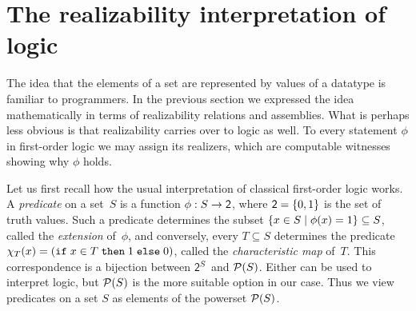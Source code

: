 





\section{The realizability interpretation of logic}
\label{sec:realizability-interpretation}


The idea that the elements of a set are represented by values of a
datatype is familiar to programmers. In the previous section we
expressed the idea mathematically in terms of realizability relations
and assemblies. What is perhaps less obvious is that realizability
carries over to logic as well. To every statement $\phi$ in
first-order logic we may assign its realizers, which are computable
witnesses showing why $\phi$ holds.

Let us first recall how the usual interpretation of classical
first-order logic works. A \emph{predicate} on a set~$S$ is a function
$\phi : S \to \mathsf{2}$, where $\mathsf{2} = \{0, 1\}$ is the set of truth
values. Such a predicate determines the subset $\{x \in S \mid
  \phi(x) = 1\} \subseteq S$, called the \emph{extension} of~$\phi$,
and conversely, every $T \subseteq S$ determines the predicate
$\chi_T(x) = (\mathtt{if}\;x \in T\;\mathtt{then}\;1\;\mathtt{else}\;0)$, called the \emph{characteristic
  map} of~$T$. This correspondence is a bijection between $\mathsf{2}^S$ and
$\mathcal{P}(S)$. Either can be used to interpret logic, but $\mathcal{P}(S)$ is the
more suitable option in our case. Thus we view predicates on a set
$S$ as elements of the powerset $\mathcal{P}(S)$.

